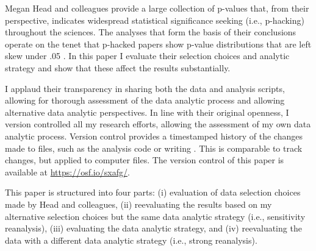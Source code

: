 Megan Head and colleagues provide a large collection of p-values that, from their perspective, indicates widespread statistical significance seeking (i.e., p-hacking) throughout the sciences. The analyses that form the basis of their conclusions operate on the tenet that p-hacked papers show p-value distributions that are left skew under .05 \cite{Simonsohn2014}. In this paper I evaluate their selection choices and analytic strategy and show that these affect the results substantially. 

I applaud their transparency in sharing both the data and analysis scripts, allowing for thorough assessment of the data analytic process and allowing alternative data analytic perspectives. In line with their original openness, I version controlled all my research efforts, allowing the assessment of my own data analytic process. Version control provides a timestamped history of the changes made to files, such as the analysis code or writing \cite{Ram2013}. This is comparable to track changes, but applied to computer files. The version control of this paper is available at \href{https://osf.io/sxafg/}{https://osf.io/sxafg/}.

This paper is structured into four parts: (i) evaluation of data selection choices made by Head and colleagues, (ii) reevaluating the results based on my alternative selection choices but the same data analytic strategy (i.e., sensitivity reanalysis), (iii) evaluating the data analytic strategy, and (iv) reevaluating the data with a different data analytic strategy (i.e., strong reanalysis). 